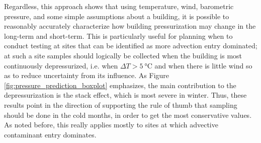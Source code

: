 Regardless, this approach shows that using temperature, wind, barometric pressure, and some simple assumptions about a building, it is possible to reasonably accurately characterize how building pressurization may change in the long-term and short-term.
This is particularly useful for planning when to conduct testing at sites that can be identified as more advection entry dominated; at such a site samples should logically be collected when the building is most continuously depressurized, i.e. when $\Delta T > \SI{5}{\degreeCelsius}$ and when there is little wind so as to reduce uncertainty from its influence.
As Figure \ref{fig:pressure_prediction_boxplot} emphasizes, the main contribution to the depressurization is the stack effect, which is most severe in winter.
Thus, these results point in the direction of supporting the rule of thumb that sampling should be done in the cold months, in order to get the most conservative values.
As noted before, this really applies mostly to sites at which advective contaminant entry dominates.\par
